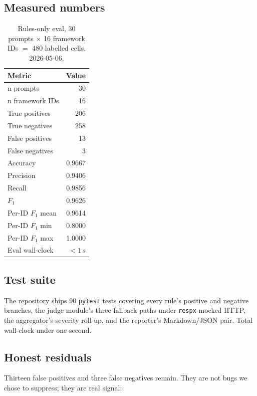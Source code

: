 \documentclass[conference]{IEEEtran}
\begin{document}
\subsection{Measured numbers}
\begin{table}[htbp]
\caption{Rules-only eval, 30 prompts $\times$ 16 framework IDs
$=$ 480 labelled cells, 2026-05-06.}
\label{tab:eval}
\centering
\renewcommand{\arraystretch}{1.1}
\begin{tabular}{lr}
\toprule
\textbf{Metric} & \textbf{Value} \\
\midrule
n prompts          & 30      \\
n framework IDs    & 16      \\
True positives     & 206     \\
True negatives     & 258     \\
False positives    & 13      \\
False negatives    & 3       \\
Accuracy           & 0.9667  \\
Precision          & 0.9406  \\
Recall             & 0.9856  \\
$F_1$              & 0.9626  \\
Per-ID $F_1$ mean  & 0.9614  \\
Per-ID $F_1$ min   & 0.8000  \\
Per-ID $F_1$ max   & 1.0000  \\
Eval wall-clock    & $<1\,s$ \\
\bottomrule
\end{tabular}
\end{table}

\subsection{Test suite}
The repository ships 90 \texttt{pytest} tests covering every rule's
positive and negative branches, the judge module's three fallback
paths under \texttt{respx}-mocked HTTP, the aggregator's severity
roll-up, and the reporter's Markdown/JSON pair. Total wall-clock
under one second.

\subsection{Honest residuals}
Thirteen false positives and three false negatives remain. They are
not bugs we chose to suppress; they are real signal:
\end{document}
